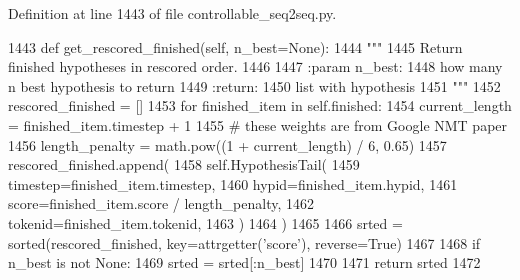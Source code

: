 Definition at line 1443 of file controllable\+\_\+seq2seq.\+py.


\begin{DoxyCode}
1443     \textcolor{keyword}{def }get\_rescored\_finished(self, n\_best=None):
1444         \textcolor{stringliteral}{"""}
1445 \textcolor{stringliteral}{        Return finished hypotheses in rescored order.}
1446 \textcolor{stringliteral}{}
1447 \textcolor{stringliteral}{        :param n\_best:}
1448 \textcolor{stringliteral}{            how many n best hypothesis to return}
1449 \textcolor{stringliteral}{        :return:}
1450 \textcolor{stringliteral}{            list with hypothesis}
1451 \textcolor{stringliteral}{        """}
1452         rescored\_finished = []
1453         \textcolor{keywordflow}{for} finished\_item \textcolor{keywordflow}{in} self.finished:
1454             current\_length = finished\_item.timestep + 1
1455             \textcolor{comment}{# these weights are from Google NMT paper}
1456             length\_penalty = math.pow((1 + current\_length) / 6, 0.65)
1457             rescored\_finished.append(
1458                 self.HypothesisTail(
1459                     timestep=finished\_item.timestep,
1460                     hypid=finished\_item.hypid,
1461                     score=finished\_item.score / length\_penalty,
1462                     tokenid=finished\_item.tokenid,
1463                 )
1464             )
1465 
1466         srted = sorted(rescored\_finished, key=attrgetter(\textcolor{stringliteral}{'score'}), reverse=\textcolor{keyword}{True})
1467 
1468         \textcolor{keywordflow}{if} n\_best \textcolor{keywordflow}{is} \textcolor{keywordflow}{not} \textcolor{keywordtype}{None}:
1469             srted = srted[:n\_best]
1470 
1471         \textcolor{keywordflow}{return} srted
1472 
\end{DoxyCode}
\mbox{\label{classprojects_1_1controllable__dialogue_1_1controllable__seq2seq_1_1controllable__seq2seq_1_1Beam_a9b904d4d56ca519849dbb3c3d51ebc68}} 
